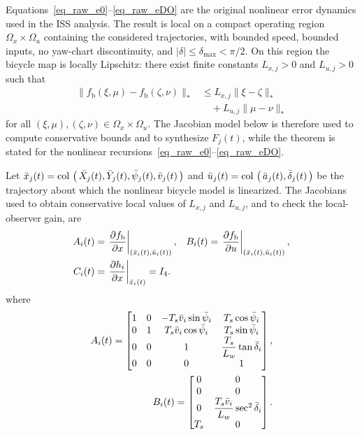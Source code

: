\documentclass[journal,twoside]{IEEEtran}
\def\col#1{\mathop{{\rm col}\,\left(\,#1\,\right)}}
\begin{document}
Equations~\eqref{eq_raw_e0}--\eqref{eq_raw_eDO} are the original nonlinear error dynamics used in the ISS analysis. The result is local on a compact operating region $\Omega_x\times\Omega_u$ containing the considered trajectories, with bounded speed, bounded inputs, no yaw-chart discontinuity, and $|\delta|\le \delta_{\max}<\pi/2$. On this region the bicycle map is locally Lipschitz: there exist finite constants $L_{x,j}>0$ and $L_{u,j}>0$ such that
\begin{equation}
\begin{aligned}
\|f_{\mathrm b}(\xi,\mu)-f_{\mathrm b}(\zeta,\nu)\|_*
&\le L_{x,j}\|\xi-\zeta\|_*\\
&\quad+L_{u,j}\|\mu-\nu\|_*
\end{aligned}
\label{eq_nonlinear_lipschitz}
\end{equation}
for all $(\xi,\mu),(\zeta,\nu)\in\Omega_x\times\Omega_u$. The Jacobian model below is therefore used to compute conservative bounds and to synthesize $F_j(t)$, while the theorem is stated for the nonlinear recursions~\eqref{eq_raw_e0}--\eqref{eq_raw_eDO}.


Let $\bar{x}_j(t)=\col{\bar X_j(t),\bar Y_j(t),\bar\psi_j(t),\bar v_j(t)}$ and
$\bar u_j(t)=\col{\bar a_j(t),\bar\delta_j(t)}$ be the trajectory about which the
nonlinear bicycle model is linearized. The Jacobians used to obtain conservative
local values of $L_{x,j}$ and $L_{u,j}$, and to check the local-observer gain, are
\begin{align}
    A_i(t)&=\left.\frac{\partial f_{\text{b}}}{\partial x}\right|_{(\bar{x}_i(t),\bar{u}_i(t))},&
    B_i(t)&=\left.\frac{\partial f_{\text{b}}}{\partial u}\right|_{(\bar{x}_i(t),\bar{u}_i(t))},\notag\\
    C_i(t)&=\left.\frac{\partial h_i}{\partial x}\right|_{\bar{x}_i(t)}  = I_4.\notag
\end{align}
where
\begin{align}
A_i(t)=
\begin{bmatrix}
1&0&-T_s\bar v_i\sin\bar\psi_i&T_s\cos\bar\psi_i\\
0&1&T_s\bar v_i\cos\bar\psi_i&T_s\sin\bar\psi_i\\
0&0&1&\dfrac{T_s}{L_w}\tan\bar\delta_i\\
0&0&0&1
\end{bmatrix},
\label{eq_bicycle_jacobian}\\
B_i(t)=
\begin{bmatrix}
0&0\\
0&0\\
0&\dfrac{T_s\bar v_i}{L_w}\sec^2\bar\delta_i\\
T_s&0
\end{bmatrix}.
\notag
\end{align}
\end{document}
